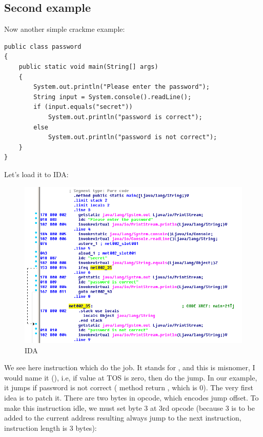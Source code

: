 \subsection{Second example}

Now another simple crackme example:

\begin{lstlisting}
public class password
{
	public static void main(String[] args)
	{
		System.out.println("Please enter the password");
		String input = System.console().readLine();
		if (input.equals("secret"))
			System.out.println("password is correct");
		else
			System.out.println("password is not correct");
	}
}
\end{lstlisting}

Let's load it to IDA:

\begin{figure}[H]
\centering
\includegraphics[scale=\FigScale]{Java_and_NET/java/13_patching/2/1.png}
\caption{IDA}
\end{figure}

We see here  instruction which do the job.
It stands for , and this is misnomer, I would name it  (), i.e, 
if value at \ac{TOS} is zero, then do the jump.
In our example, it jumps if password is not correct ( method return , which is 0).
The very first idea is to patch it.
There are two bytes in  opcode, which encodes jump offset.
To make this instruction idle, we must set byte 3 at 3rd opcode
(because 3 is to be added to the current address resulting always jump to the next instruction,
 instruction length is 3 bytes):

